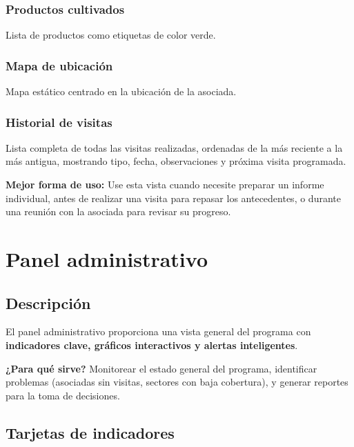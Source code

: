 \documentclass[12pt]{article}
\begin{document}
\subsubsection{Productos cultivados}
Lista de productos como etiquetas de color verde.

\subsubsection{Mapa de ubicación}
Mapa estático centrado en la ubicación de la asociada.

\subsubsection{Historial de visitas}
Lista completa de todas las visitas realizadas, ordenadas de la más reciente a la más antigua, mostrando tipo, fecha, observaciones y próxima visita programada.

\begin{tipbox}
  \textbf{Mejor forma de uso:} Use esta vista cuando necesite preparar un informe individual, antes de realizar una visita para repasar los antecedentes, o durante una reunión con la asociada para revisar su progreso.
\end{tipbox}

\section{Panel administrativo}
\label{sec:admin}

\subsection{Descripción}
\label{subsec:admin-descripcion}

El panel administrativo proporciona una vista general del programa con \textbf{indicadores clave, gráficos interactivos y alertas inteligentes}.

\begin{infobox}
  \textbf{¿Para qué sirve?} Monitorear el estado general del programa, identificar problemas (asociadas sin visitas, sectores con baja cobertura), y generar reportes para la toma de decisiones.
\end{infobox}

\subsection{Tarjetas de indicadores}
\end{document}
